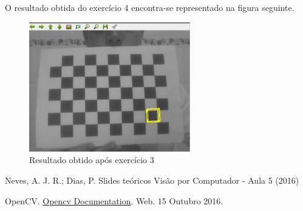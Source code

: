\documentclass[portuguese, times, mirror]{revdetua}
\begin{document}
O resultado obtida do exercício 4 encontra-se representado na figura seguinte. 


\begin{figure}[ht!]
\centering
\includegraphics[width=70mm]{img/ex4.png}
\caption{Resultado obtido após exercício 3}
\end{figure}



\begin{thebibliography}{1} %



Neves, A. J. R.; Dias, P. Slides teóricos Visão por Computador - Aula 5 (2016)


OpenCV. \href{hhttp://docs.opencv.org/}{Opencv Documentation}. Web. 15 Outubro 2016. 




\end{thebibliography}
\end{document}
